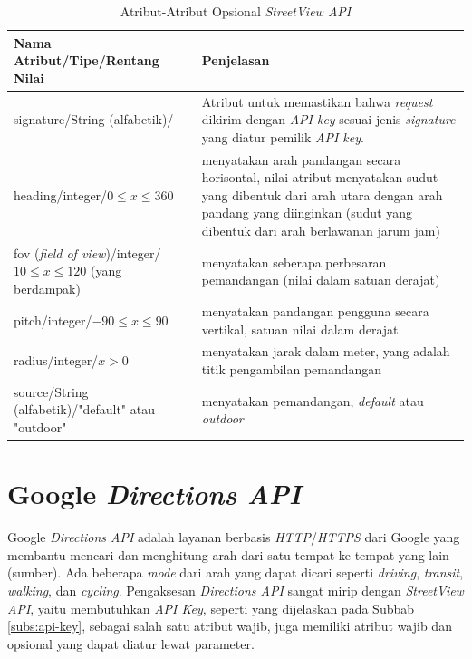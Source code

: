 \begin{table}[ht!]
	\centering
	\caption{Atribut-Atribut Opsional \textit{StreetView API}}
	\label{tab:atribut-opsional-streetview-api}
\begin{tabular}{|p{7cm}|p{7cm}|}
\hline
Nama Atribut/Tipe/Rentang Nilai & Penjelasan \\ \hline \hline
signature/String (alfabetik)/- &  Atribut untuk memastikan bahwa \textit{request} dikirim dengan {\it API key} sesuai jenis \textit{signature} yang diatur pemilik {\it API key}.  \\ \hline
heading/integer/$ 0 \leq x \leq 360 $ & menyatakan arah pandangan secara horisontal, nilai atribut menyatakan sudut yang dibentuk dari arah utara dengan arah pandang yang diinginkan (sudut yang dibentuk dari arah berlawanan jarum jam) \\ \hline
fov (\textit{field of view})/integer/$ 10 \leq x \leq 120 $ (yang berdampak) & menyatakan seberapa perbesaran pemandangan (nilai dalam satuan derajat) \\ \hline
pitch/integer/$ -90 \leq  x \leq 90$ & menyatakan pandangan pengguna secara vertikal, satuan nilai dalam derajat.\\ \hline
radius/integer/$ x > 0 $ & menyatakan jarak dalam meter, yang adalah titik pengambilan pemandangan\\ \hline
source/String (alfabetik)/"default" atau "outdoor" & menyatakan pemandangan, \textit{default} atau \textit{outdoor}\\ 
\hline

\end{tabular}
\end{table}

\section{Google {\it Directions API}}
\label{sec:directions}
Google {\it Directions API} adalah layanan berbasis \textit{HTTP}/\textit{HTTPS} dari Google yang membantu mencari dan menghitung arah dari satu tempat ke tempat yang lain (sumber). Ada beberapa \textit{mode} dari arah yang dapat dicari seperti {\it driving}, {\it transit}, {\it walking}, dan {\it cycling}. Pengaksesan \textit{Directions API} sangat mirip dengan {\it StreetView API}, yaitu membutuhkan \textit{API Key}, seperti yang dijelaskan pada Subbab \ref{subs:api-key}, sebagai salah satu atribut wajib, juga memiliki atribut wajib dan opsional yang dapat diatur lewat parameter. 

